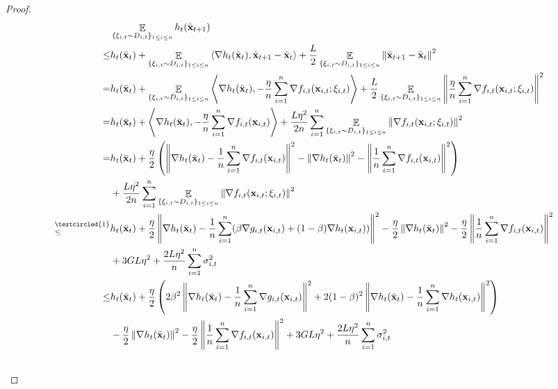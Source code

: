 \documentclass{article}
\begin{document}
\begin{proof}
\begin{align}
\nonumber
& \EE_{ \{\xi_{i,t} \sim D_{i,t}\}_{1\le i \le n} }h_t(\bar{\x}_{t+1}) \\ \nonumber
\le & h_t(\bar{\x}_t) + \EE_{ \{\xi_{i,t} \sim D_{i,t}\}_{1\le i \le n} }\lrangle{\nabla h_t(\bar{\x}_t), \bar{\x}_{t+1} - \bar{\x}_t} + \frac{L}{2}\EE_{ \{\xi_{i,t} \sim D_{i,t}\}_{1\le i \le n} }\lrnorm{\bar{\x}_{t+1} - \bar{\x}_t}^2 \\ \nonumber
= & h_t(\bar{\x}_t) + \EE_{ \{\xi_{i,t} \sim D_{i,t}\}_{1\le i \le n} }\lrangle{\nabla h_t(\bar{\x}_t), -\frac{\eta}{n}\sum_{i=1}^n \nabla f_{i,t}(\x_{i,t};\xi_{i,t})} + \frac{L}{2} \EE_{ \{\xi_{i,t} \sim D_{i,t}\}_{1\le i \le n} }\lrnorm{\frac{\eta}{n}\sum_{i=1}^n \nabla f_{i,t}(\x_{i,t};\xi_{i,t})}^2 \\ \nonumber
= & h_t(\bar{\x}_t) + \lrangle{\nabla h_t(\bar{\x}_t), -\frac{\eta}{n}\sum_{i=1}^n \nabla f_{i,t}(\x_{i,t})} + \frac{L\eta^2}{2n}\sum_{i=1}^n\EE_{ \{\xi_{i,t} \sim D_{i,t}\}_{1\le i \le n} }\lrnorm{ \nabla f_{i,t}(\x_{i,t};\xi_{i,t})}^2 \\ \nonumber
= & h_t(\bar{\x}_t) + \frac{\eta}{2}\lrincir{ \lrnorm{\nabla h_t(\bar{\x}_t) -\frac{1}{n}\sum_{i=1}^n \nabla f_{i,t}(\x_{i,t})}^2 - \lrnorm{\nabla h_t(\bar{\x}_t)}^2 - \lrnorm{\frac{1}{n}\sum_{i=1}^n \nabla f_{i,t}(\x_{i,t})}^2 } \\ \nonumber 
& + \frac{L\eta^2}{2n}\sum_{i=1}^n\EE_{ \{\xi_{i,t} \sim D_{i,t}\}_{1\le i \le n} }\lrnorm{ \nabla f_{i,t}(\x_{i,t};\xi_{i,t})}^2 \\ \nonumber
\refabovecir{\le}{\textcircled{1}} & h_t(\bar{\x}_t) + \frac{\eta}{2}\lrnorm{\nabla h_t(\bar{\x}_t) -\frac{1}{n}\sum_{i=1}^n (\beta \nabla g_{i,t}(\x_{i,t}) + (1-\beta)\nabla h_t(\x_{i,t}))}^2 - \frac{\eta}{2}\lrnorm{\nabla h_t(\bar{\x}_t)}^2 - \frac{\eta}{2}\lrnorm{\frac{1}{n}\sum_{i=1}^n \nabla f_{i,t}(\x_{i,t})}^2 \\ \nonumber 
&+ 3GL\eta^2  + \frac{2L\eta^2}{n}\sum_{i=1}^n \sigma_{i,t}^2 \\ \nonumber
\le & h_t(\bar{\x}_t) + \frac{\eta}{2}\lrincir{2\beta^2\lrnorm{\nabla h_t(\bar{\x}_t) -\frac{1}{n}\sum_{i=1}^n \nabla g_{i,t}(\x_{i,t})}^2 + 2(1-\beta)^2\lrnorm{\nabla h_t(\bar{\x}_t) -\frac{1}{n}\sum_{i=1}^n \nabla h_t(\x_{i,t})}^2  } \\ \nonumber 
&- \frac{\eta}{2}\lrnorm{\nabla h_t(\bar{\x}_t)}^2 - \frac{\eta}{2}\lrnorm{\frac{1}{n}\sum_{i=1}^n \nabla f_{i,t}(\x_{i,t})}^2  + 3GL\eta^2  + \frac{2L\eta^2}{n}\sum_{i=1}^n \sigma_{i,t}^2  \\ \nonumber

\end{align}
\end{proof}
\end{document}
